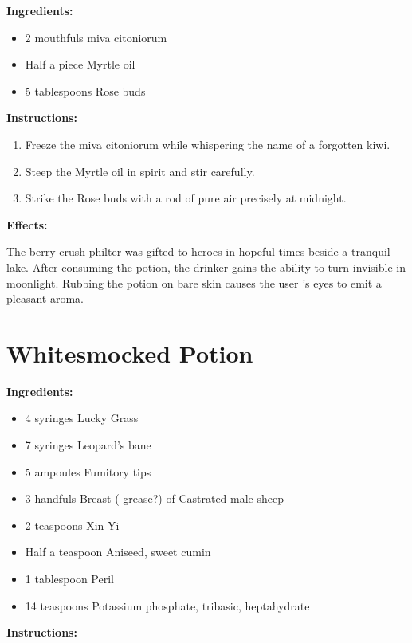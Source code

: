 \documentclass{article}
\begin{document}
\textbf{Ingredients:}

\begin{itemize}
  \item 2 mouthfuls miva citoniorum
  \item Half a piece Myrtle oil
  \item 5 tablespoons Rose buds
\end{itemize}

\textbf{Instructions:}

\begin{enumerate}
  \item Freeze the miva citoniorum while whispering the name of a forgotten kiwi.
  \item Steep the Myrtle oil in spirit and stir carefully.
  \item Strike the Rose buds with a rod of pure air precisely at midnight.
\end{enumerate}

\textbf{Effects:}

The berry crush philter was gifted to heroes in hopeful times beside a tranquil lake. After consuming the potion, the drinker gains the ability to turn invisible in moonlight. Rubbing the potion on bare skin causes the user 's eyes to emit a pleasant aroma.

\newpage
\section*{Whitesmocked Potion}

\textbf{Ingredients:}

\begin{itemize}
  \item 4 syringes Lucky Grass
  \item 7 syringes Leopard's bane
  \item 5 ampoules Fumitory tips
  \item 3 handfuls Breast ( grease?) of Castrated male sheep
  \item 2 teaspoons Xin Yi
  \item Half a teaspoon Aniseed, sweet cumin
  \item 1 tablespoon Peril
  \item 14 teaspoons Potassium phosphate, tribasic, heptahydrate
\end{itemize}

\textbf{Instructions:}
\end{document}
